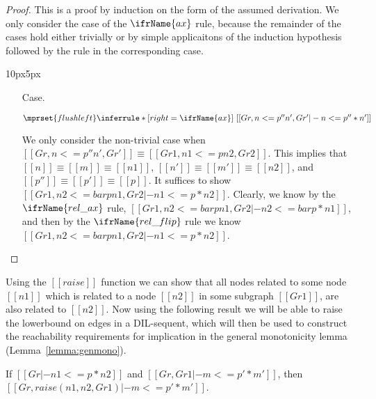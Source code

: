   \begin{proof}
    This is a proof by induction on the form of the assumed
    derivation.  We only consider the case of the $\ifrName{\normalsize ax}$ rule,
    because the remainder of the cases hold either trivially or by
    simple applicaitons of the induction hypothesis followed by the
    rule in the corresponding case.
    \vspace{-25px}
    \begin{changemargin}{10px}{5px}\noindent
    \begin{itemize}
    \item[Case.]\ \\ 
      \begin{center}
        \begin{math}
          $$\mprset{flushleft}
          \inferrule* [right=\ifrName{ax}] {
            \ 
          }{[[Gr , n <= p'' n' , Gr' |- n <= p'' * n']]}
        \end{math}
      \end{center}
      We only consider the non-trivial case when $[[Gr , n <= p'' n' , Gr']] \equiv [[Gr1 , n1 <=p n2, Gr2]]$.
      This implies that $[[n]] \equiv [[m]] \equiv [[n1]]$, $[[n']] \equiv [[m']] \equiv [[n2]]$, and 
      $[[p'']] \equiv [[p']] \equiv [[p]]$.  
      It suffices to show $[[Gr1 , n2 <=bar p n1, Gr2 |- n1 <= p * n2]]$.  Clearly, we know by the $\ifrName{\normalsize rel\_ax}$
      rule, $[[Gr1 , n2 <=bar p n1, Gr2 |- n2 <=bar p * n1]]$, and then by the $\ifrName{\normalsize rel\_flip}$ rule we know
      $[[Gr1 , n2 <=bar p n1, Gr2 |- n1 <=p * n2]]$.    
    \end{itemize}
    \end{changemargin}
  \end{proof}
Using the $[[raise]]$ function we can show that all nodes related to
some node $[[n1]]$ which is related to a node $[[n2]]$ in some
subgraph $[[Gr1]]$, are also related to $[[n2]]$.  Now using the
following result we will be able to raise the lowerbound on edges in
a DIL-sequent, which will then be used to construct the reachability
requirements for implication in the general monotonicity lemma
(Lemma~\ref{lemma:genmono}).
\begin{lemma}
  \label{lemma:raise_lower}
  If $[[Gr |- n1 <=p* n2]]$ and $[[Gr, Gr1 |- m <=p' * m']]$, then $[[Gr, raise(n1,n2,Gr1) |- m <=p' * m']]$.
\end{lemma}
